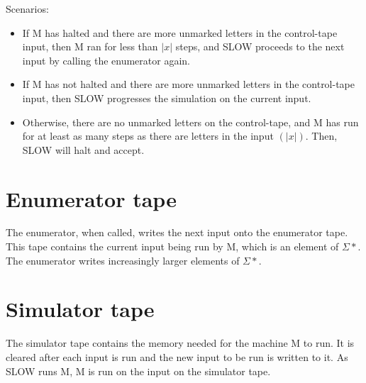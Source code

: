 \documentclass[11pt,addpoints,answers]{exam}
\newcommand{\1}{\mathbf{1}}
\begin{document}
\noindent Scenarios:
\begin{itemize}
    \item If M has halted and there are more unmarked letters in the control-tape input, then M ran for less than $|x|$ steps, and SLOW proceeds to the next input by calling the enumerator again.
    \item If M has not halted and there are more unmarked letters in the control-tape input, then SLOW progresses the simulation on the current input.
    \item Otherwise, there are no unmarked letters on the control-tape, and M has run for at least as many steps as there are letters in the input $(|x|)$. Then, SLOW will halt and accept.
\end{itemize}

\section{Enumerator tape}

The enumerator, when called, writes the next input onto the enumerator tape. This tape contains the current input being run by M, which is an element of $\Sigma *$. The enumerator writes increasingly larger elements of  $\Sigma *$.

\section{Simulator tape}

The simulator tape contains the memory needed for the machine M to run. It is cleared after each input is run and the new input to be run is written to it. As SLOW runs M, M is run on the input on the simulator tape.
\end{document}
